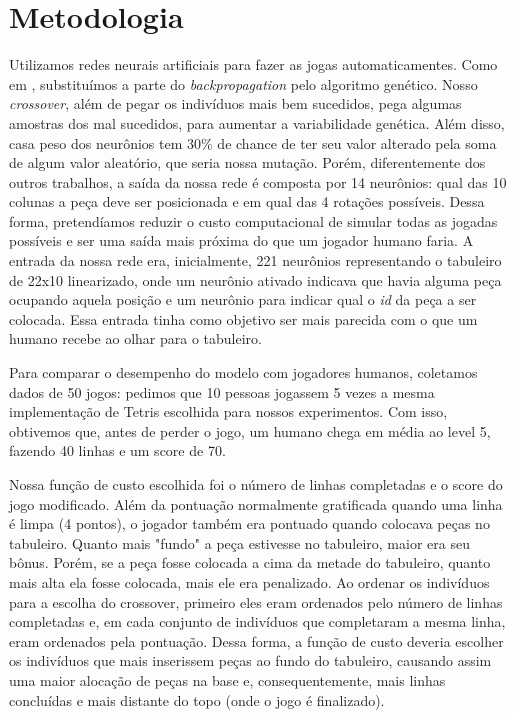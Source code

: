 \documentclass[conference]{IEEEtran}
\begin{document}
\section{Metodologia}
Utilizamos redes neurais artificiais para fazer as jogas automaticamentes. Como em \cite{b8}, substituímos a parte do \textit{backpropagation} pelo algoritmo genético. Nosso \textit{crossover}, além de pegar os indivíduos mais bem sucedidos, pega algumas amostras dos mal sucedidos, para aumentar a variabilidade genética. Além disso, casa peso dos neurônios tem 30\% de chance de ter seu valor alterado pela soma de algum valor aleatório, que seria nossa mutação.   Porém, diferentemente dos outros trabalhos, a saída da nossa rede é composta por 14 neurônios: qual das 10 colunas a peça deve ser posicionada e em qual das 4 rotações possíveis. Dessa forma, pretendíamos reduzir o custo computacional de simular todas as jogadas possíveis e ser uma saída mais próxima do que um jogador humano faria. A entrada da nossa rede era, inicialmente, 221 neurônios representando o tabuleiro de 22x10 linearizado, onde um neurônio ativado indicava que havia alguma peça ocupando aquela posição e um neurônio para indicar qual o \textit{id} da peça a ser colocada. Essa entrada tinha como objetivo ser mais parecida com o que um humano recebe ao olhar para o tabuleiro.

Para comparar o desempenho do modelo com jogadores humanos, coletamos dados de 50 jogos: pedimos que 10 pessoas jogassem 5 vezes a mesma implementação de Tetris escolhida para nossos experimentos. Com isso, obtivemos que, antes de perder o jogo, um humano chega em média ao level 5, fazendo 40 linhas e um score de 70.

Nossa função de custo escolhida foi o número de linhas completadas e o score do jogo modificado. Além da pontuação normalmente gratificada quando uma linha é limpa (4 pontos), o jogador também era pontuado quando colocava peças no tabuleiro. Quanto mais "fundo" a peça estivesse no tabuleiro, maior era seu bônus. Porém, se a peça fosse colocada a cima da metade do tabuleiro, quanto mais alta ela fosse colocada, mais ele era penalizado. Ao ordenar os indivíduos para a escolha do crossover, primeiro eles eram ordenados pelo número de linhas completadas e, em cada conjunto de indivíduos que completaram a mesma linha, eram ordenados pela pontuação. Dessa forma, a função de custo deveria escolher os indivíduos que mais inserissem peças ao fundo do tabuleiro, causando assim uma maior alocação de peças na base e, consequentemente, mais linhas concluídas e mais distante do topo (onde o jogo é finalizado).
\end{document}
